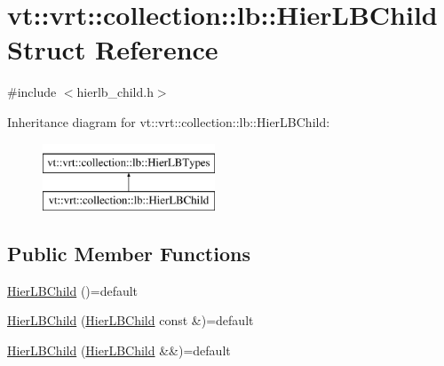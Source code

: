 \hypertarget{structvt_1_1vrt_1_1collection_1_1lb_1_1_hier_l_b_child}{}\section{vt\+:\+:vrt\+:\+:collection\+:\+:lb\+:\+:Hier\+L\+B\+Child Struct Reference}
\label{structvt_1_1vrt_1_1collection_1_1lb_1_1_hier_l_b_child}


{\ttfamily \#include $<$hierlb\+\_\+child.\+h$>$}

Inheritance diagram for vt\+:\+:vrt\+:\+:collection\+:\+:lb\+:\+:Hier\+L\+B\+Child\+:\begin{figure}[H]
\begin{center}
\leavevmode
\includegraphics[height=2.000000cm]{structvt_1_1vrt_1_1collection_1_1lb_1_1_hier_l_b_child}
\end{center}
\end{figure}
\subsection*{Public Member Functions}
\begin{DoxyCompactItemize}
\item 
\hyperlink{structvt_1_1vrt_1_1collection_1_1lb_1_1_hier_l_b_child_a657aeb08f5f8e1779ecde563abec1059}{Hier\+L\+B\+Child} ()=default
\item 
\hyperlink{structvt_1_1vrt_1_1collection_1_1lb_1_1_hier_l_b_child_a349980da5ebabb01e9aeeb9ec1a28863}{Hier\+L\+B\+Child} (\hyperlink{structvt_1_1vrt_1_1collection_1_1lb_1_1_hier_l_b_child}{Hier\+L\+B\+Child} const \&)=default
\item 
\hyperlink{structvt_1_1vrt_1_1collection_1_1lb_1_1_hier_l_b_child_a963c60d090d020244803a90ff4a0fb77}{Hier\+L\+B\+Child} (\hyperlink{structvt_1_1vrt_1_1collection_1_1lb_1_1_hier_l_b_child}{Hier\+L\+B\+Child} \&\&)=default
\end{DoxyCompactItemize}
